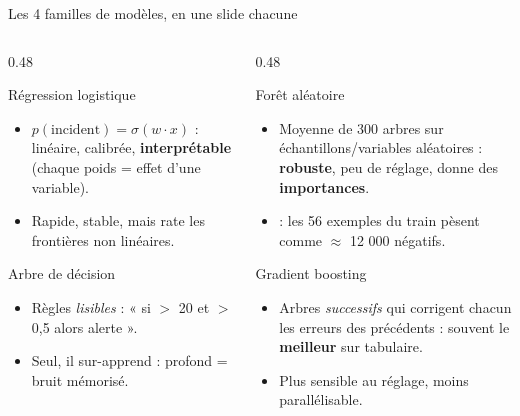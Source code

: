 \begin{frame}{Les 4 familles de modèles, en une slide chacune}
\begin{columns}[t]
\begin{column}{0.48\textwidth}
\begin{block}{Régression logistique}
\begin{itemize}
\item $p(\text{incident}) = \sigma(w \cdot x)$ : linéaire, calibrée,
\textbf{interprétable} (chaque poids = effet d'une variable).
\item Rapide, stable, mais rate les frontières non linéaires.
\end{itemize}
\end{block}
\begin{block}{Arbre de décision}
\begin{itemize}
\item Règles \emph{ lisibles} : « si  $>$ 20 et
 $>$ 0,5 alors alerte ».
\item Seul, il sur-apprend : profond = bruit mémorisé.
\end{itemize}
\end{block}
\end{column}
\begin{column}{0.48\textwidth}
\begin{block}{Forêt aléatoire}
\begin{itemize}
\item Moyenne de 300 arbres sur échantillons/variables aléatoires :
\textbf{robuste}, peu de réglage, donne des \textbf{importances}.
\item {} : les 56 exemples du train
pèsent comme $\approx$ 12 000 négatifs.
\end{itemize}
\end{block}
\begin{block}{Gradient boosting}
\begin{itemize}
\item Arbres \emph{successifs} qui corrigent chacun les erreurs des
précédents : souvent le \textbf{meilleur} sur tabulaire.
\item Plus sensible au réglage, moins parallélisable.
\end{itemize}
\end{block}
\end{column}
\end{columns}
\end{frame}

